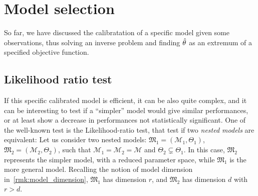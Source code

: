 \documentclass[../../Main_ManuscritThese.tex]{subfiles}
\begin{document}
\section{Model selection}
\label{sec:model_selection}
So far, we have discussed the calibratation of a specific model given some observations, thus solving an inverse problem and finding $\hat{\theta}_{\mathrm{}}$ as an extremum of a specified objective function.

\subsection{Likelihood ratio test}
\label{sec:likelihood_ratio_test}

If this specific calibrated model is efficient, it can be also quite complex, and it can be interesting to test if a ``simpler'' model would give similar performances, or at least show a decrease in performances not statistically significant.
One of the well-known test is the Likelihood-ratio test, that test if two \emph{nested models} are equivalent:
Let us consider two nested models: $\mathfrak{M}_1 = (\mathcal{M}_1, \Theta_1)$, $\mathfrak{M}_2= (\mathcal{M}_2,\Theta_2)$, such that $\mathcal{M}_1=\mathcal{M}_2=\mathcal{M}$ and $\Theta_2 \subsetneq \Theta_1$. In this case, $\mathfrak{M}_2$ represents the simpler model, with a reduced parameter space, while $\mathfrak{M}_1$ is the more general model. Recalling the notion of model dimension in~\cref{rmk:model_dimension},  $\mathfrak{M}_1$ has dimension $r$, and $\mathfrak{M}_2$ has dimension $d$ with $r>d$.
\end{document}
